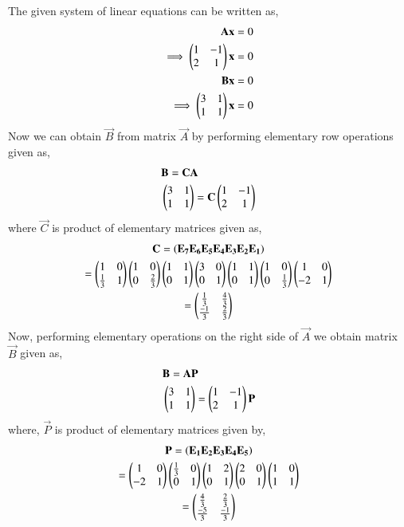 The given system of linear equations can be written as,   
\begin{align}
    \mathbf{A}\mathbf{x} &= 0 \\
    \implies\begin{pmatrix}1&-1\\2&1\end{pmatrix}\mathbf{x} &= 0 \label{eq:solutions/1/1/2/ax=0}\\
    \mathbf{B}\mathbf{x} &= 0 \\
    \implies\begin{pmatrix}3&1\\1&1\end{pmatrix}\mathbf{x} &= 0 \label{eq:solutions/1/1/2/bx=0}
\end{align}
Now we can obtain $\vec{B}$ from matrix $\vec{A}$ by performing elementary row operations given as, 
\begin{align}
    &\mathbf{B} = \mathbf{C}\mathbf{A} \label{eq:solutions/1/1/2/b=ca}\\
    &\begin{pmatrix}3&1\\1&1\end{pmatrix} = \mathbf{C}\begin{pmatrix}1&-1\\2&1\end{pmatrix} \label{eq:solutions/1/1/2/eq:ca}
\end{align}
where $\vec{C}$ is product of elementary matrices given as, 
\begin{multline}
    \mathbf{C} = \left(\mathbf{E_7}\mathbf{E_6}\mathbf{E_5}\mathbf{E_4}\mathbf{E_3}\mathbf{E_2}\mathbf{E_1}\right)\\
    =\begin{pmatrix}1&0\\\frac{1}{3}&1\end{pmatrix}\begin{pmatrix}1&0\\0&\frac{2}{3}\end{pmatrix}\begin{pmatrix}1&1\\0&1\end{pmatrix}\begin{pmatrix}3&0\\0&1\end{pmatrix} \begin{pmatrix}1&1\\0&1\end{pmatrix}\begin{pmatrix}1&0\\0&\frac{1}{3}\end{pmatrix}\begin{pmatrix}1&0\\-2&1\end{pmatrix}\\
    =\begin{pmatrix}\frac{1}{3}&\frac{4}{3} \\ \frac{-1}{3}&\frac{2}{3}\end{pmatrix}
\end{multline}
Now, performing elementary operations on the right side of $\vec{A}$ we obtain matrix $\vec{B}$ given as, 
\begin{align}
    &\mathbf{B} = \mathbf{A}\mathbf{P} \label{eq:solutions/1/1/2/b=ap}\\
    &\begin{pmatrix}3&1\\1&1\end{pmatrix} = \begin{pmatrix}1&-1\\2&1\end{pmatrix}\mathbf{P}
\end{align}
where, $\vec{P}$ is product of elementary matrices given by, 
\begin{multline}
    \mathbf{P} = \left(\mathbf{E_1}\mathbf{E_2}\mathbf{E_3}\mathbf{E_4}\mathbf{E_5}\right)\\
    =\begin{pmatrix}1&0\\-2&1\end{pmatrix}\begin{pmatrix}\frac{1}{3}&0\\0&1\end{pmatrix}\begin{pmatrix}1&2\\0&1\end{pmatrix}\begin{pmatrix}2&0\\0&1\end{pmatrix}\begin{pmatrix}1&0\\1&1\end{pmatrix} \\
    = \begin{pmatrix}\frac{4}{3}&\frac{2}{3}\\ \frac{-5}{3}&\frac{-1}{3}\end{pmatrix}
\end{multline}
